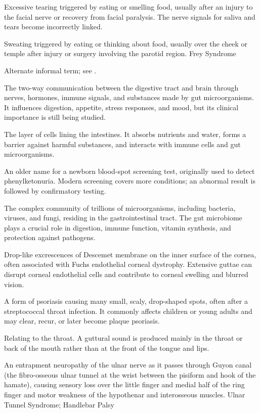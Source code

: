  Excessive tearing triggered by eating or smelling food, usually after an injury to the facial nerve or recovery from facial paralysis. The nerve signals for saliva and tears become incorrectly linked.

 Sweating triggered by eating or thinking about food, usually over the cheek or temple after injury or surgery involving the parotid region.
\synonyms
Frey Syndrome

 Alternate informal term; see .

 The two-way communication between the digestive tract and brain through nerves, hormones, immune signals, and substances made by gut microorganisms. It influences digestion, appetite, stress responses, and mood, but its clinical importance is still being studied.

 The layer of cells lining the intestines. It absorbs nutrients and water, forms a barrier against harmful substances, and interacts with immune cells and gut microorganisms.

 An older name for a newborn blood-spot screening test, originally used to detect phenylketonuria. Modern screening covers more conditions; an abnormal result is followed by confirmatory testing.

 The complex community of trillions of microorganisms, including bacteria, viruses, and
fungi, residing in the gastrointestinal tract. The gut microbiome plays a crucial role
in digestion, immune function, vitamin synthesis, and protection against pathogens.

 Drop-like excrescences of Descemet membrane on the inner surface of the cornea, often associated with Fuchs endothelial corneal dystrophy. Extensive guttae can disrupt corneal endothelial cells and contribute to corneal swelling and blurred vision.

 A form of psoriasis causing many small, scaly, drop-shaped spots, often after a streptococcal throat infection. It commonly affects children or young adults and may clear, recur, or later become plaque psoriasis.

 Relating to the throat. A guttural sound is produced mainly in the throat or back of the mouth rather than at the front of the tongue and lips.

 An entrapment neuropathy of the ulnar nerve as it passes through Guyon canal (the fibro-osseous ulnar tunnel at the wrist between the pisiform and hook of the hamate), causing sensory loss over the little finger and medial half of the ring finger and motor weakness of the hypothenar and interosseous muscles.
\synonyms
Ulnar Tunnel Syndrome; Handlebar Palsy

